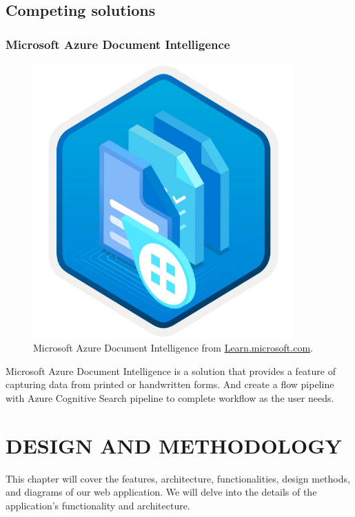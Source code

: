 \documentclass[12pt,oneside,openright,a4paper]{cpe-english-project}
\begin{document}
\section{Competing solutions}
\subsection{Microsoft Azure Document Intelligence}
\begin{figure}[H]
\centering
\includegraphics[width=10cm]{./assets/Microsoft-Azure.jpg}
\caption{Microsoft Azure Document Intelligence from 
\href{https://learn.microsoft.com/th-th/training/achievements/extract-data-from-forms-use-form-recognizer.svg}{Learn.microsoft.com}.}
\label{fig:figure-2.4}  
\end{figure}

	Microsoft Azure Document Intelligence is a solution that provides a feature of  capturing data from printed or handwritten forms. And create a flow pipeline with Azure Cognitive Search pipeline to complete workflow as the user needs.
\chapter{DESIGN AND METHODOLOGY}

This chapter will cover the features, architecture, functionalities, design methods, and
diagrams of our web application. We will delve into the details of the application’s
functionality and architecture.
\end{document}
